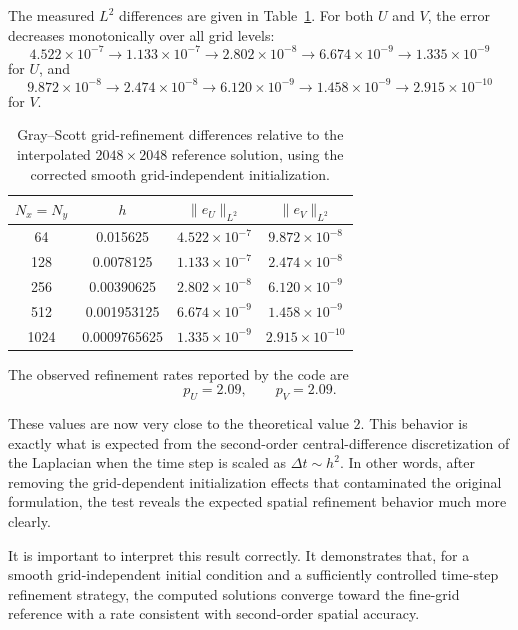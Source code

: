The measured \(L^2\) differences are given in Table~\ref{tab:grayscott_grid_refinement}. For both \(U\) and \(V\), the error decreases monotonically over all grid levels:
\[
4.522\times 10^{-7}
\rightarrow
1.133\times 10^{-7}
\rightarrow
2.802\times 10^{-8}
\rightarrow
6.674\times 10^{-9}
\rightarrow
1.335\times 10^{-9}
\]
for \(U\), and
\[
9.872\times 10^{-8}
\rightarrow
2.474\times 10^{-8}
\rightarrow
6.120\times 10^{-9}
\rightarrow
1.458\times 10^{-9}
\rightarrow
2.915\times 10^{-10}
\]
for \(V\).

\begin{table}[htbp]
\centering
\caption{Gray--Scott grid-refinement differences relative to the interpolated \(2048\times 2048\) reference solution, using the corrected smooth grid-independent initialization.}
\label{tab:grayscott_grid_refinement}
\begin{tabular}{|c|c|c|c|}
\hline
\(N_x=N_y\) & \(h\) & \(\|e_U\|_{L^2}\) & \(\|e_V\|_{L^2}\) \\
\hline
64   & 0.015625     & \(4.522\times 10^{-7}\) & \(9.872\times 10^{-8}\) \\
128  & 0.0078125    & \(1.133\times 10^{-7}\) & \(2.474\times 10^{-8}\) \\
256  & 0.00390625   & \(2.802\times 10^{-8}\) & \(6.120\times 10^{-9}\) \\
512  & 0.001953125  & \(6.674\times 10^{-9}\) & \(1.458\times 10^{-9}\) \\
1024 & 0.0009765625 & \(1.335\times 10^{-9}\) & \(2.915\times 10^{-10}\) \\
\hline
\end{tabular}
\end{table}

The observed refinement rates reported by the code are
\[
p_U = 2.09, \qquad p_V = 2.09.
\]

These values are now very close to the theoretical value \(2\). This behavior is exactly what is expected from the second-order central-difference discretization of the Laplacian when the time step is scaled as \(\Delta t \sim h^2\). In other words, after removing the grid-dependent initialization effects that contaminated the original formulation, the test reveals the expected spatial refinement behavior much more clearly.

It is important to interpret this result correctly. It demonstrates that, for a smooth grid-independent initial condition and a sufficiently controlled time-step refinement strategy, the computed solutions converge toward the fine-grid reference with a rate consistent with second-order spatial accuracy.

